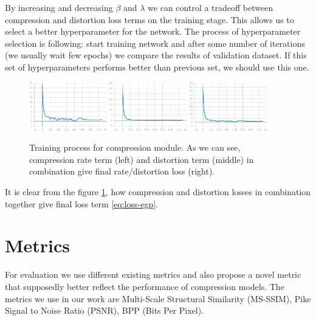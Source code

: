 By increasing and decreasing $\beta$ and $\lambda$ we can control a tradeoff between compression and distortion loss terms on the training stage. This allows us to select a better hyperparameter for the network. The process of hyperparameter selection is following: start training network and after some number of iterations (we usually wait few epochs) we compare the results of validation dataset. If this set of hyperparameters performs better than previous set, we should use this one.

\begin{figure}[!ht]
    \centering
    \includegraphics[width=0.3\textwidth]{figure/weighted_compression_weighted_rate.png}
    \includegraphics[width=0.3\textwidth]{figure/weighted_compression_weighted_distortion.png}
    \includegraphics[width=0.3\textwidth]{figure/weighted_compression_weighted_R_D.png}
    \caption{Training process for compression module. As we can see, compression rate term (left) and distortion term (middle) in combination give final rate/distortion loss (right).}
    \label{compession-losses}
\end{figure}

It is clear from the figure \ref{compession-losses}, how compression and distortion losses in combination together give final loss term \ref{eq:loss-egp}.

\section{Metrics}

For evaluation we use different existing metrics and also propose a novel metric that supposedly better reflect the performance of compression models. The metrics we use in our work are Multi-Scale Structural Similarity (MS-SSIM), Pike Signal to Noise Ratio (PSNR), BPP (Bits Per Pixel).


